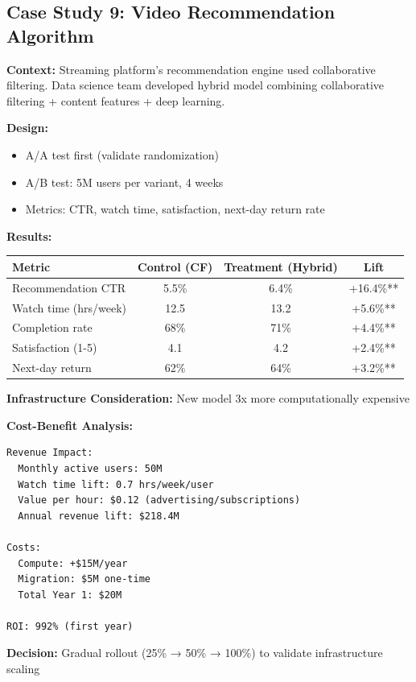 \subsection{Case Study 9: Video Recommendation Algorithm}

\textbf{Context:} Streaming platform's recommendation engine used collaborative filtering. Data science team developed hybrid model combining collaborative filtering + content features + deep learning.

\textbf{Design:}
\begin{itemize}
    \item A/A test first (validate randomization)
    \item A/B test: 5M users per variant, 4 weeks
    \item Metrics: CTR, watch time, satisfaction, next-day return rate
\end{itemize}

\textbf{Results:}
\begin{center}
\begin{tabular}{lccc}
\toprule
\textbf{Metric} & \textbf{Control (CF)} & \textbf{Treatment (Hybrid)} & \textbf{Lift} \\
\midrule
Recommendation CTR & 5.5\% & 6.4\% & +16.4\%** \\
Watch time (hrs/week) & 12.5 & 13.2 & +5.6\%** \\
Completion rate & 68\% & 71\% & +4.4\%** \\
Satisfaction (1-5) & 4.1 & 4.2 & +2.4\%** \\
Next-day return & 62\% & 64\% & +3.2\%** \\
\bottomrule
\end{tabular}
\end{center}

\textbf{Infrastructure Consideration:} New model 3x more computationally expensive

\textbf{Cost-Benefit Analysis:}
\begin{verbatim}
Revenue Impact:
  Monthly active users: 50M
  Watch time lift: 0.7 hrs/week/user
  Value per hour: $0.12 (advertising/subscriptions)
  Annual revenue lift: $218.4M

Costs:
  Compute: +$15M/year
  Migration: $5M one-time
  Total Year 1: $20M

ROI: 992% (first year)
\end{verbatim}

\textbf{Decision:} Gradual rollout (25\% → 50\% → 100\%) to validate infrastructure scaling

